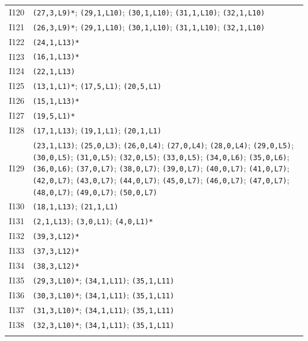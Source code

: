 {\begin{longtable}{@{}r p{14.7cm}@{}}
I120 & \texttt{(27,3,L9)*}; \texttt{(29,1,L10)}; \texttt{(30,1,L10)}; \texttt{(31,1,L10)}; \texttt{(32,1,L10)}\\\addlinespace[3pt]
I121 & \texttt{(26,3,L9)*}; \texttt{(29,1,L10)}; \texttt{(30,1,L10)}; \texttt{(31,1,L10)}; \texttt{(32,1,L10)}\\\addlinespace[3pt]
I122 & \texttt{(24,1,L13)*}\\\addlinespace[3pt]
I123 & \texttt{(16,1,L13)*}\\\addlinespace[3pt]
I124 & \texttt{(22,1,L13)}\\\addlinespace[3pt]
I125 & \texttt{(13,1,L1)*}; \texttt{(17,5,L1)}; \texttt{(20,5,L1)}\\\addlinespace[3pt]
I126 & \texttt{(15,1,L13)*}\\\addlinespace[3pt]
I127 & \texttt{(19,5,L1)*}\\\addlinespace[3pt]
I128 & \texttt{(17,1,L13)}; \texttt{(19,1,L1)}; \texttt{(20,1,L1)}\\\addlinespace[3pt]
I129 & \texttt{(23,1,L13)}; \texttt{(25,0,L3)}; \texttt{(26,0,L4)}; \texttt{(27,0,L4)}; \texttt{(28,0,L4)}; \texttt{(29,0,L5)}; \texttt{(30,0,L5)}; \texttt{(31,0,L5)}; \texttt{(32,0,L5)}; \texttt{(33,0,L5)}; \texttt{(34,0,L6)}; \texttt{(35,0,L6)}; \texttt{(36,0,L6)}; \texttt{(37,0,L7)}; \texttt{(38,0,L7)}; \texttt{(39,0,L7)}; \texttt{(40,0,L7)}; \texttt{(41,0,L7)}; \texttt{(42,0,L7)}; \texttt{(43,0,L7)}; \texttt{(44,0,L7)}; \texttt{(45,0,L7)}; \texttt{(46,0,L7)}; \texttt{(47,0,L7)}; \texttt{(48,0,L7)}; \texttt{(49,0,L7)}; \texttt{(50,0,L7)}\\\addlinespace[3pt]
I130 & \texttt{(18,1,L13)}; \texttt{(21,1,L1)}\\\addlinespace[3pt]
I131 & \texttt{(2,1,L13)}; \texttt{(3,0,L1)}; \texttt{(4,0,L1)*}\\\addlinespace[3pt]
I132 & \texttt{(39,3,L12)*}\\\addlinespace[3pt]
I133 & \texttt{(37,3,L12)*}\\\addlinespace[3pt]
I134 & \texttt{(38,3,L12)*}\\\addlinespace[3pt]
I135 & \texttt{(29,3,L10)*}; \texttt{(34,1,L11)}; \texttt{(35,1,L11)}\\\addlinespace[3pt]
I136 & \texttt{(30,3,L10)*}; \texttt{(34,1,L11)}; \texttt{(35,1,L11)}\\\addlinespace[3pt]
I137 & \texttt{(31,3,L10)*}; \texttt{(34,1,L11)}; \texttt{(35,1,L11)}\\\addlinespace[3pt]
I138 & \texttt{(32,3,L10)*}; \texttt{(34,1,L11)}; \texttt{(35,1,L11)}\\\addlinespace[3pt]

\end{longtable}}

